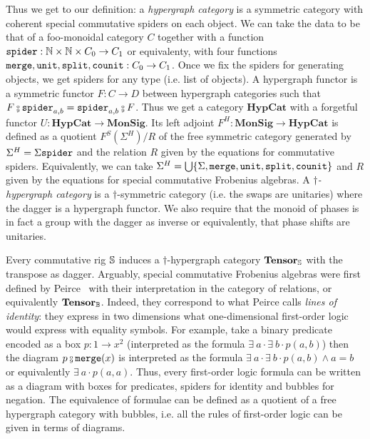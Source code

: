 Thus we get to our definition: a \emph{hypergraph category} is a symmetric category with coherent special commutative spiders on each object.
We can take the data to be that of a foo-monoidal category $C$ together with a function $\spider : \N \times \N \times C_0 \to C_1$ or equivalenty, with four functions $\merge, \unit, \ttsplit, \counit : C_0 \to C_1$.
Once we fix the spiders for generating objects, we get spiders for any type (i.e. list of objects).
A hypergraph functor is a symmetric functor $F : C \to D$ between hypergraph categories such that $F \fcmp \spider_{a, b} = \spider_{a, b} \fcmp F$.
Thus we get a category $\mathbf{HypCat}$ with a forgetful functor $U : \mathbf{HypCat} \to \mathbf{MonSig}$.
Its left adjoint $F^H : \mathbf{MonSig} \to \mathbf{HypCat}$ is defined as a quotient $F^S(\Sigma^H) / R$ of the free symmetric category generated by $\Sigma^H = \Sigma \spider$ and the relation $R$ given by the equations for commutative spiders.
Equivalently, we can take $\Sigma^H = \bigcup \{ \Sigma, \merge, \unit, \ttsplit, \counit \}$ and $R$ given by the equations for special commutative Frobenius algebras.
A \emph{$\dagger$-hypergraph category} is a $\dagger$-symmetric category (i.e. the swaps are unitaries) where the dagger is a hypergraph functor.
We also require that the monoid of phases is in fact a group with the dagger as inverse or equivalently, that phase shifts are unitaries.

\begin{example}
Every commutative rig $\S$ induces a $\dagger$-hypergraph category $\mathbf{Tensor}_\S$ with the transpose as dagger.
Arguably, special commutative Frobenius algebras were first defined by Peirce~\cite{Peirce06} with their interpretation in the category of relations, or equivalently $\mathbf{Tensor}_\B$.
Indeed, they correspond to what Peirce calls \emph{lines of identity}: they express in two dimensions what one-dimensional first-order logic would express with equality symbols.
For example, take a binary predicate encoded as a box $p : 1 \to x^2$ (interpreted as the formula $\exists \ a \cdot \exists \ b \cdot p(a, b)$) then the diagram $p \fcmp \merge(x)$ is interpreted as the formula $\exists \ a \cdot \exists \ b \cdot p(a, b) \land a = b$ or equivalently $\exists \ a \cdot p(a, a)$.
Thus, every first-order logic formula can be written as a diagram with boxes for predicates, spiders for identity and bubbles for negation.
The equivalence of formulae can be defined as a quotient of a free hypergraph category with bubbles, i.e. all the rules of first-order logic can be given in terms of diagrams.
\end{example}

